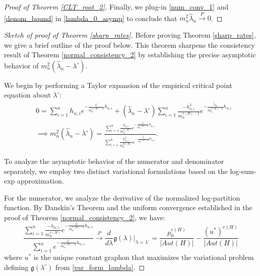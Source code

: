 \documentclass[12pt]{article}
\numberwithin{equation}{section}
\begin{document}
\begin{proof}[Proof of Theorem \ref{CLT_root_2}]
Finally, we plug-in \eqref{num_conv_1} and \eqref{denom_bound} in \eqref{lambda_0_asymp} to conclude
that $m_n^2\hat{\lambda}_n\xrightarrow{P} 0$.

\end{proof}

\begin{proof}[Sketch of proof of Theorem \ref{sharp_rates}]
Before proving Theorem \ref{sharp_rates}, we give a brief outline of the proof below. This theorem sharpens the consistency result of Theorem \ref{normal_consistency_2} by establishing the precise asymptotic behavior of $m_n^2(\hat{\lambda}_n-\lambda^{\circ})$.

We begin by performing a Taylor expansion of the empirical critical point equation about $\lambda^{\circ}$:
\begin{align*}
&0 = \sum\limits_{i=1}^{n} h_{n,i} e^{-\frac{\lambda^{\circ}}{m_n^{v(H)-2}}h_{n,i}} + (\hat{\lambda}_n - \lambda^{\circ})\sum\limits_{i=1}^{n} \frac{-h_{n,i}^2}{m_n^{v(H)-2}}e^{-\frac{\tilde{\lambda}_n}{m_n^{v(H)-2}}h_{n,i}}\\
&\implies m_n^2(\hat{\lambda}_n - \lambda^{\circ}) = \frac{\sum\limits_{i=1}^{n}\frac{h_{n,i}}{m_n^{v(H)}}e^{-\frac{\lambda^{\circ}}{m_n^{v(H)-2}}h_{n,i}}}{\sum\limits_{i=1}^{n}\frac{h_{n,i}^2}{m_n^{2v(H)}}e^{-\frac{\tilde{\lambda}_n}{m_n^{v(H)-2}}h_{n,i}} }.
\end{align*}

To analyze the asymptotic behavior of the numerator and denominator separately, we employ two distinct variational formulations based on the log-sum-exp approximation.

For the numerator, we analyze the derivative of the normalized log-partition function. By Danskin's Theorem \cite{danskin1966theory} and the uniform convergence established in the proof of Theorem \ref{normal_consistency_2}, we have:
\begin{equation}
\frac{\sum\limits_{i=1}^{n}\frac{-h_{n,i}}{m_n^{v(H)}}e^{-\frac{\lambda^{\circ}}{m_n^{v(H)-2}}h_{n,i}}}{\sum\limits_{i=1}^{n}e^{-\frac{\lambda^{\circ}}{m_n^{v(H)-2}}h_{n,i}}} \xrightarrow{P} \frac{d}{d\lambda} \mathfrak{g}(\lambda) \bigg|_{\lambda=\lambda^{\circ}} = \frac{p_0^{e(H)}}{|Aut(H)|} - \frac{(u^*)^{e(H)}}{|Aut(H)|}
\label{num_conv}\end{equation}
where $u^*$ is the unique constant graphon that maximizes the variational problem defining $\mathfrak{g}(\lambda^\circ)$ from \eqref{var_form_lambda}.


\end{proof}
\end{document}
